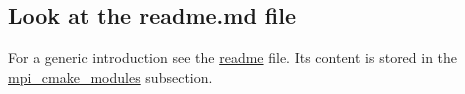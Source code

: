 \subsection*{Look at the readme.\+md file}

For a generic introduction see the \hyperlink{md_readme}{readme} file. It\textquotesingle{}s content is stored in the \hyperlink{md_readme}{mpi\+\_\+cmake\+\_\+modules} subsection. 